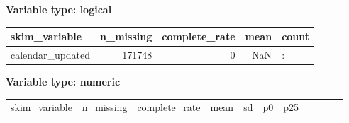\documentclass[
]{article}
\begin{document}
\textbf{Variable type: logical}

\begin{longtable}[]{@{}lrrrl@{}}
\toprule\noalign{}
skim\_variable & n\_missing & complete\_rate & mean & count \\
\midrule\noalign{}
\endhead
\bottomrule\noalign{}
\endlastfoot
calendar\_updated & 171748 & 0 & NaN & : \\
\end{longtable}

\textbf{Variable type: numeric}

\begin{longtable}[]{@{}
  >{\raggedright\arraybackslash}p{}
  >{\raggedleft\arraybackslash}p{}
  >{\raggedleft\arraybackslash}p{}
  >{\raggedleft\arraybackslash}p{}
  >{\raggedleft\arraybackslash}p{}
  >{\raggedleft\arraybackslash}p{}
  >{\raggedleft\arraybackslash}p{}
  >{\raggedleft\arraybackslash}p{}
  >{\raggedleft\arraybackslash}p{}
  >{\raggedleft\arraybackslash}p{}
  >{\raggedright\arraybackslash}p{}@{}}
\toprule\noalign{}
\begin{minipage}[b]{\linewidth}\raggedright
skim\_variable
\end{minipage} & \begin{minipage}[b]{\linewidth}\raggedleft
n\_missing
\end{minipage} & \begin{minipage}[b]{\linewidth}\raggedleft
complete\_rate
\end{minipage} & \begin{minipage}[b]{\linewidth}\raggedleft
mean
\end{minipage} & \begin{minipage}[b]{\linewidth}\raggedleft
sd
\end{minipage} & \begin{minipage}[b]{\linewidth}\raggedleft
p0
\end{minipage} & \begin{minipage}[b]{\linewidth}\raggedleft
p25
\end{minipage} & \begin{minipage}[b]{\linewidth}\raggedleft

\end{minipage}
\end{longtable}
\end{document}
